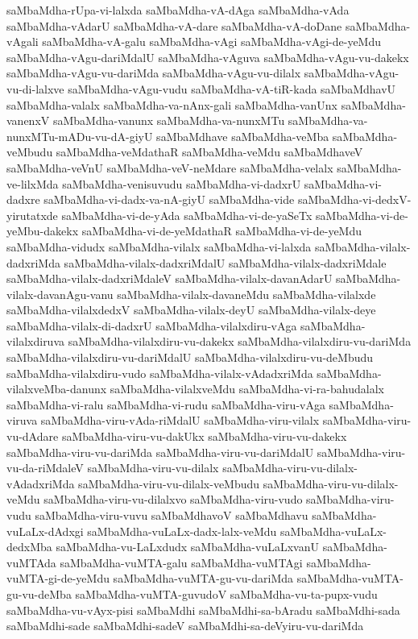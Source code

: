 {saMbaMdha-rUpa-vi-lalxda
saMbaMdha-vA-dAga
saMbaMdha-vAda
saMbaMdha-vAdarU
saMbaMdha-vA-dare
saMbaMdha-vA-doDane
saMbaMdha-vAgali
saMbaMdha-vA-galu
saMbaMdha-vAgi
saMbaMdha-vAgi-de-yeMdu
saMbaMdha-vAgu-dariMdalU
saMbaMdha-vAguva
saMbaMdha-vAgu-vu-dakekx
saMbaMdha-vAgu-vu-dariMda
saMbaMdha-vAgu-vu-dilalx
saMbaMdha-vAgu-vu-di-lalxve
saMbaMdha-vAgu-vudu
saMbaMdha-vA-tiR-kada
saMbaMdhavU
saMbaMdha-valalx
saMbaMdha-va-nAnx-gali
saMbaMdha-vanUnx
saMbaMdha-vanenxV
saMbaMdha-vanunx
saMbaMdha-va-nunxMTu
saMbaMdha-va-nunxMTu-mADu-vu-dA-giyU
saMbaMdhave
saMbaMdha-veMba
saMbaMdha-veMbudu
saMbaMdha-veMdathaR
saMbaMdha-veMdu
saMbaMdhaveV
saMbaMdha-veVnU
saMbaMdha-veV-neMdare
saMbaMdha-velalx
saMbaMdha-ve-lilxMda
saMbaMdha-venisuvudu
saMbaMdha-vi-dadxrU
saMbaMdha-vi-dadxre
saMbaMdha-vi-dadx-va-nA-giyU
saMbaMdha-vide
saMbaMdha-vi-dedxV-yirutatxde
saMbaMdha-vi-de-yAda
saMbaMdha-vi-de-yaSeTx
saMbaMdha-vi-de-yeMbu-dakekx
saMbaMdha-vi-de-yeMdathaR
saMbaMdha-vi-de-yeMdu
saMbaMdha-vidudx
saMbaMdha-vilalx
saMbaMdha-vi-lalxda
saMbaMdha-vilalx-dadxriMda
saMbaMdha-vilalx-dadxriMdalU
saMbaMdha-vilalx-dadxriMdale
saMbaMdha-vilalx-dadxriMdaleV
saMbaMdha-vilalx-davanAdarU
saMbaMdha-vilalx-davanAgu-vanu
saMbaMdha-vilalx-davaneMdu
saMbaMdha-vilalxde
saMbaMdha-vilalxdedxV
saMbaMdha-vilalx-deyU
saMbaMdha-vilalx-deye
saMbaMdha-vilalx-di-dadxrU
saMbaMdha-vilalxdiru-vAga
saMbaMdha-vilalxdiruva
saMbaMdha-vilalxdiru-vu-dakekx
saMbaMdha-vilalxdiru-vu-dariMda
saMbaMdha-vilalxdiru-vu-dariMdalU
saMbaMdha-vilalxdiru-vu-deMbudu
saMbaMdha-vilalxdiru-vudo
saMbaMdha-vilalx-vAdadxriMda
saMbaMdha-vilalxveMba-danunx
saMbaMdha-vilalxveMdu
saMbaMdha-vi-ra-bahudalalx
saMbaMdha-vi-ralu
saMbaMdha-vi-rudu
saMbaMdha-viru-vAga
saMbaMdha-viruva
saMbaMdha-viru-vAda-riMdalU
saMbaMdha-viru-vilalx
saMbaMdha-viru-vu-dAdare
saMbaMdha-viru-vu-dakUkx
saMbaMdha-viru-vu-dakekx
saMbaMdha-viru-vu-dariMda
saMbaMdha-viru-vu-dariMdalU
saMbaMdha-viru-vu-da-riMdaleV
saMbaMdha-viru-vu-dilalx
saMbaMdha-viru-vu-dilalx-vAdadxriMda
saMbaMdha-viru-vu-dilalx-veMbudu
saMbaMdha-viru-vu-dilalx-veMdu
saMbaMdha-viru-vu-dilalxvo
saMbaMdha-viru-vudo
saMbaMdha-viru-vudu
saMbaMdha-viru-vuvu
saMbaMdhavoV
saMbaMdhavu
saMbaMdha-vuLaLx-dAdxgi
saMbaMdha-vuLaLx-dadx-lalx-veMdu
saMbaMdha-vuLaLx-dedxMba
saMbaMdha-vu-LaLxdudx
saMbaMdha-vuLaLxvanU
saMbaMdha-vuMTAda
saMbaMdha-vuMTA-galu
saMbaMdha-vuMTAgi
saMbaMdha-vuMTA-gi-de-yeMdu
saMbaMdha-vuMTA-gu-vu-dariMda
saMbaMdha-vuMTA-gu-vu-deMba
saMbaMdha-vuMTA-guvudoV
saMbaMdha-vu-ta-pupx-vudu
saMbaMdha-vu-vAyx-pisi
saMbaMdhi
saMbaMdhi-sa-bAradu
saMbaMdhi-sada
saMbaMdhi-sade
saMbaMdhi-sadeV
saMbaMdhi-sa-deVyiru-vu-dariMda
}
